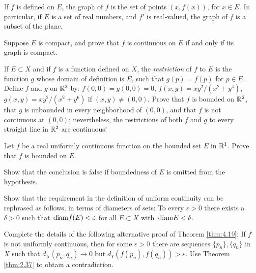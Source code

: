 \begin{myexercise}
    \label{ex:4.6}
    If $f$ is defined on $E$, the graph of $f$ is the set of points $(x, f(x))$, for $x \in E$. 
    In particular, if $E$ is a set of real numbers, and $f'$ is real-valued, the graph of $f$ is a subset of the plane.
    
    Suppose $E$ is compact, and prove that $f$ is continuous on $E$ if and only if its graph is compact.
\end{myexercise}


\begin{myexercise}
    \label{ex:4.7}
    If $E \subset X$ and if $f$ is a function defined on $X$, 
    the \emph{restriction} of $f$ to $E$ is the function $g$ whose domain of definition is $E$, such that $g(p) =f(p)$ for $p \in E$. 
    Define $f$ and $g$ on ${\protect\mathbb R}^2$ by: 
    $f(0, 0) = g(0, 0) = 0$, 
    $f(x, y) = xy^2 /(x^2 + y^4)$, 
    $g(x, y) = xy^2 /(x^2 + y^6)$ 
    if $(x, y) \neq  (0, 0)$. 
    Prove that $f$ is bounded on ${\protect\mathbb R}^2$, 
    that $g$ is unbounded in every neighborhood of $(0, 0)$, 
    and that $f$ is not continuous at $(0, 0)$; 
    nevertheless, the restrictions of both $f$ and $g$ to every straight line in ${\protect\mathbb R}^2$ are continuous!
\end{myexercise}


\begin{myexercise}
    \label{ex:4.8}
    Let $f$ be a real uniformly continuous function on the bounded set $E$ in ${\protect\mathbb R}^1$. 
    Prove that $f$ is bounded on $E$. 

    Show that the conclusion is false if boundedness of $E$ is omitted from the hypothesis.
\end{myexercise}


\begin{myexercise}
    \label{ex:4.9}
    Show that the requirement in the definition of uniform continuity can be rephrased as follows, in terms of diameters of sets: 
    To every $\varepsilon > 0$ there exists a $\delta > 0$ 
    such that $\protect\mathop{}\mathrm{diam} f(E) < \varepsilon$ for all $E \subset X$ with $\protect\mathop{}\mathrm{diam} E < \delta$.
\end{myexercise}


\begin{myexercise}
    \label{ex:4.10}
    Complete the details of the following alternative proof of Theorem \ref{thm:4.19}: 
    If $f$ is not uniformly continuous, 
    then for some $\varepsilon > 0$ there are sequences $\{p_n\}, \{q_n\}$ in $X$ such that $d_X(p_n, q_n) \rightarrow 0$ but $d_Y(f(p_n),f(q_n)) > \varepsilon$. 
    Use Theorem \ref{thm:2.37} to obtain a contradiction.
\end{myexercise}



